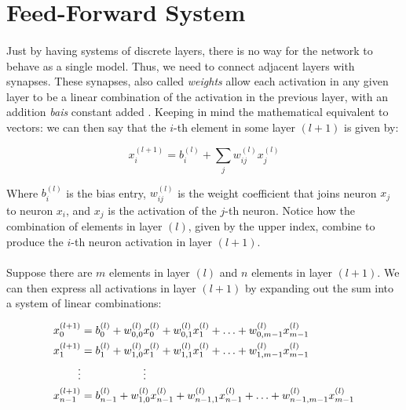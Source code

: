 \documentclass[12pt,letterpaper]{article}
\begin{document}
\section{Feed-Forward System}

\paragraph*{}Just by having systems of discrete layers, there is no way for the network to behave as a single model. Thus, we need to connect adjacent layers with synapses. These synapses, also called \textit{weights} allow each activation in any given layer to be a linear combination of the activation in the previous layer, with an addition \textit{bais} constant added \cite{Geron,Loy}. Keeping in mind the mathematical equivalent to vectors: we can then say that the $i$-th element in some layer $(l+1)$ is given by:

\begin{equation}
\label{single element}
x^{(l+1)}_i = b^{(l)}_i + \sum_{j} w^{(l)}_{ij} x^{(l)}_j
\end{equation}

Where $b^{(l)}_i$ is the bias entry, $w^{(l)}_{ij}$ is the weight coefficient that joins neuron $x_j$ to neuron $x_i$, and $x_j$ is the activation of the $j$-th neuron.  Notice how the combination of elements in layer $(l)$, given by the upper index, combine to produce the $i$-th neuron activation in layer $(l+1)$. 

\paragraph*{}Suppose there are $m$ elements in layer $(l)$ and $n$ elements in layer $(l+1)$. We can then express all activations in layer $(l+1)$ by expanding out the sum into a system of linear combinations:

\begin{equation}
\begin{split}
\label{system elements}
x^{(l+1)}_0 &= b^{(l)}_0 + w^{(l)}_{0,0} x^{(l)}_0 + w^{(l)}_{0,1} x^{(l)}_1 + \hdots + w^{(l)}_{0,m-1} x^{(l)}_{m-1}  \\
x^{(l+1)}_1 &= b^{(l)}_1 + w^{(l)}_{1,0} x^{(l)}_1 + w^{(l)}_{1,1} x^{(l)}_1 + \hdots + w^{(l)}_{1,m-1} x^{(l)}_{m-1}  \\
\vdots & \text{\hspace{2cm}} \vdots \\
x^{(l+1)}_{n-1} &= b^{(l)}_{n-1} + w^{(l)}_{1,0} x^{(l)}_{n-1} + w^{(l)}_{n-1,1} x^{(l)}_{n-1} + \hdots + w^{(l)}_{n-1,m-1} x^{(l)}_{m-1}  \\
\end{split}
\end{equation}
\end{document}
